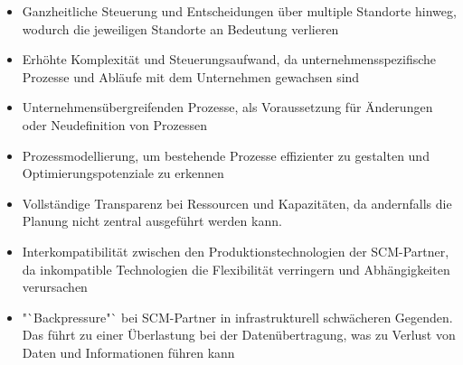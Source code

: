 \begin{itemize}
	\item Ganzheitliche Steuerung und Entscheidungen über multiple Standorte hinweg, wodurch die jeweiligen Standorte an Bedeutung verlieren
	\item Erhöhte Komplexität und Steuerungsaufwand, da unternehmensspezifische Prozesse und Abläufe mit dem Unternehmen gewachsen sind
	\item Unternehmensübergreifenden Prozesse, als Voraussetzung für Änderungen oder Neudefinition von Prozessen
	\item Prozessmodellierung, um bestehende Prozesse effizienter zu gestalten und Optimierungspotenziale zu erkennen
	\item Vollständige Transparenz bei Ressourcen und Kapazitäten, da andernfalls die Planung nicht zentral ausgeführt werden kann. 
	\item Interkompatibilität zwischen den Produktionstechnologien der \ac{SCM}-Partner, da inkompatible Technologien die Flexibilität verringern und Abhängigkeiten verursachen
	\item "`Backpressure"` bei \ac{SCM}-Partner in infrastrukturell schwächeren Gegenden. Das führt zu einer Überlastung bei der Datenübertragung, was zu Verlust von Daten und Informationen führen kann
\end{itemize}

